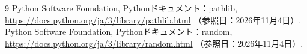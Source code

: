 \renewcommand{\refname}{参考文献}
{}
\begin{thebibliography}{9}
  Python Software Foundation, Pythonドキュメント：pathlib,
  \url{https://docs.python.org/ja/3/library/pathlib.html}
  （参照日：2026年11月4日）.
  Python Software Foundation, Pythonドキュメント：random,
  \url{https://docs.python.org/ja/3/library/random.html}
  （参照日：2026年11月4日）.
\end{thebibliography}
